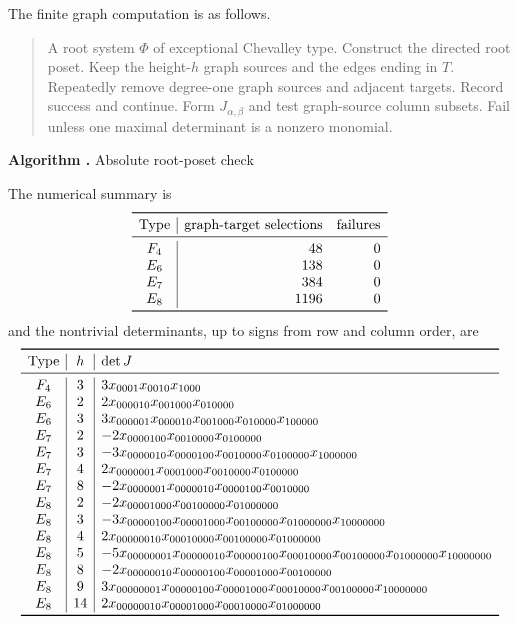\documentclass[11pt]{amsart}
\newcommand{\algorithmcaption}[2]{%
  \refstepcounter{figure}\label{#2}%
  \begin{center}\small\textbf{Algorithm \thefigure.} #1\end{center}}
\begin{document}
The finite graph computation is as follows.

\begin{quote}
\begin{algorithmic}[1]
\Require A root system $\Phi$ of exceptional Chevalley type.
\State Construct the directed root poset.
    \State Keep the height-$h$ graph sources and the edges ending in $T$.
    \State Repeatedly remove degree-one graph sources and adjacent targets.
      \State Record success and continue.
    \EndIf
    \State Form $J_{\alpha,\beta}$ and test graph-source column subsets.
    \State Fail unless one maximal determinant is a nonzero monomial.
  \EndFor
\EndFor
\end{algorithmic}
\end{quote}
\algorithmcaption{Absolute root-poset check}{alg:absolute-root-posets}

The numerical summary is
\[
\begin{array}{c|rr}
\toprule
\text{Type}&\text{graph-target selections}&\text{failures}\\
\midrule
F_4&48&0\\
E_6&138&0\\
E_7&384&0\\
E_8&1196&0\\
\bottomrule
\end{array}
\]
and the nontrivial determinants, up to signs from row and column order, are
\begingroup
\small
\[
\begin{array}{c|c|l}
\toprule
\text{Type}&h&\det J\\
\midrule
F_4&3&3x_{0001}x_{0010}x_{1000}\\
E_6&2&2x_{000010}x_{001000}x_{010000}\\
E_6&3&3x_{000001}x_{000010}x_{001000}x_{010000}x_{100000}\\
E_7&2&-2x_{0000100}x_{0010000}x_{0100000}\\
E_7&3&-3x_{0000010}x_{0000100}x_{0010000}x_{0100000}x_{1000000}\\
E_7&4&2x_{0000001}x_{0001000}x_{0010000}x_{0100000}\\
E_7&8&-2x_{0000001}x_{0000010}x_{0000100}x_{0010000}\\
E_8&2&-2x_{00001000}x_{00100000}x_{01000000}\\
E_8&3&-3x_{00000100}x_{00001000}x_{00100000}x_{01000000}x_{10000000}\\
E_8&4&2x_{00000010}x_{00010000}x_{00100000}x_{01000000}\\
E_8&5&-5x_{00000001}x_{00000010}x_{00000100}x_{00010000}x_{00100000}x_{01000000}x_{10000000}\\
E_8&8&-2x_{00000010}x_{00000100}x_{00001000}x_{00100000}\\
E_8&9&3x_{00000001}x_{00000100}x_{00001000}x_{00010000}x_{00100000}x_{10000000}\\
E_8&14&2x_{00000010}x_{00001000}x_{00010000}x_{01000000}\\
\bottomrule
\end{array}
\]
\endgroup
\end{document}
